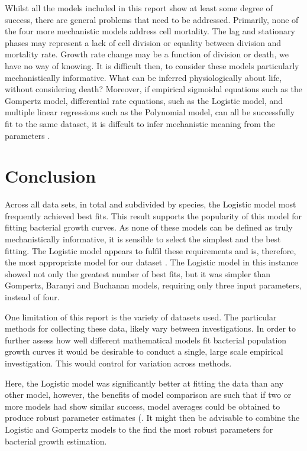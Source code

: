 \documentclass[titlepage]{article}
\begin{document}
\indent Whilst all the models included in this report show at least some degree of success, there are general problems that need to be addressed. Primarily, none of the four more mechanistic models address cell mortality. The lag and stationary phases may represent a lack of cell division or equality between division and mortality rate. Growth rate change may be a function of division or death, we have no way of knowing. It is difficult then, to consider these models particularly mechanistically informative. What can be inferred physiologically about life, without considering death? Moreover, if empirical sigmoidal equations such as the Gompertz model, differential rate equations, such as the Logistic model, and multiple linear regressions such as the Polynomial model, can all be successfully fit to the same dataset, it is diffcult to infer mechanistic meaning from the parameters \cite{peleg2011microbial}.\
      
  
  





\section{Conclusion}
Across all data sets, in total and subdivided by species, the Logistic model most frequently achieved best fits. This result supports the popularity of this model for fitting bacterial growth curves. As none of these models can be defined as truly mechanistically informative, it is sensible to select the simplest and the best fitting. The Logistic model appears to fulfil these requirements and is, therefore, the most appropriate model for our dataset \cite{peleg2011microbial}. The Logistic model in this instance showed not only the greatest number of best fits, but it was simpler than Gompertz, Baranyi and Buchanan models, requiring only three input parameters, instead of four.\

\indent One limitation of this report is the variety of datasets used. The particular methods for collecting these data, likely vary between investigations. In order to further assess how well different mathematical models fit bacterial population growth curves it would be desirable to conduct a single, large scale empirical investigation. This would control for variation across methods. \

\indent Here, the Logistic model was significantly better at fitting the data than any other model, however, the benefits of model comparison are such that if two or more models had show similar success, model averages could be obtained to produce robust parameter estimates (\cite{johnson2004model}. It might then be advisable to combine the Logistic and Gompertz models to the find the most robust parameters for bacterial growth estimation. \
\end{document}
